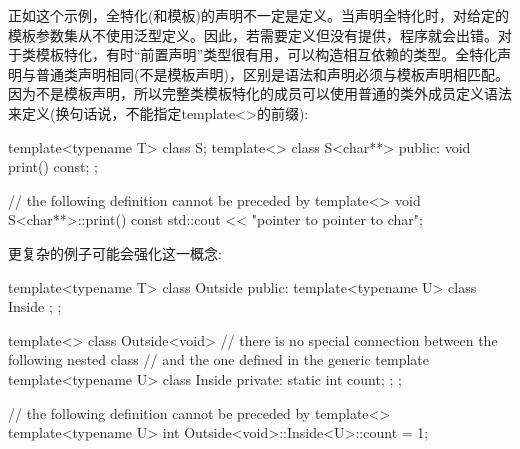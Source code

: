 
正如这个示例，全特化(和模板)的声明不一定是定义。当声明全特化时，对给定的模板参数集从不使用泛型定义。因此，若需要定义但没有提供，程序就会出错。对于类模板特化，有时“前置声明”类型很有用，可以构造相互依赖的类型。全特化声明与普通类声明相同(不是模板声明)，区别是语法和声明必须与模板声明相匹配。因为不是模板声明，所以完整类模板特化的成员可以使用普通的类外成员定义语法来定义(换句话说，不能指定template<>的前缀):

\begin{cpp}
template<typename T>
class S;
template<> class S<char**> {
	public:
	void print() const;
};

// the following definition cannot be preceded by template<>
void S<char**>::print() const
{
	std::cout << "pointer to pointer to char\n";
}
\end{cpp}

更复杂的例子可能会强化这一概念:

\begin{cpp}
template<typename T>
class Outside {
	public:
	template<typename U>
	class Inside {
	};
};

template<>
class Outside<void> {
	// there is no special connection between the following nested class
	// and the one defined in the generic template
	template<typename U>
	class Inside {
		private:
		static int count;
	};
};

// the following definition cannot be preceded by template<>
template<typename U>
int Outside<void>::Inside<U>::count = 1;
\end{cpp}


